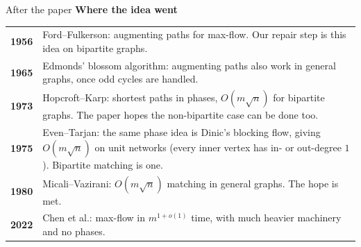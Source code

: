 \documentclass[aspectratio=169,11pt]{beamer}
\begin{document}
\begin{frame}{After the paper}
\textbf{Where the idea went}\par\vspace{2mm}
\small
\renewcommand{\arraystretch}{1.3}
\begin{tabular}{@{}p{1cm}p{11.2cm}@{}}
\textbf{\textcolor{hkblue}{1956}} & Ford--Fulkerson: augmenting paths for max-flow. Our repair step is this idea on bipartite graphs.\\
\textbf{\textcolor{hkblue}{1965}} & Edmonds' blossom algorithm: augmenting paths also work in general graphs, once odd cycles are handled.\\
\textbf{\textcolor{hkblue}{1973}} & Hopcroft--Karp: shortest paths in phases, $O(m\sqrt n)$ for bipartite graphs. The paper hopes the non-bipartite case can be done too.\\
\textbf{\textcolor{hkblue}{1975}} & Even--Tarjan: the same phase idea is Dinic's blocking flow, giving $O(m\sqrt n)$ on unit networks (every inner vertex has in- or out-degree $1$). Bipartite matching is one.\\
\textbf{\textcolor{hkblue}{1980}} & Micali--Vazirani: $O(m\sqrt n)$ matching in general graphs. The hope is met.\\
\textbf{\textcolor{hkblue}{2022}} & Chen et al.: max-flow in $m^{1+o(1)}$ time, with much heavier machinery and no phases.\\
\end{tabular}
\end{frame}

\begin{frame}
\vfill
{}
\vfill
\end{frame}
\end{document}
